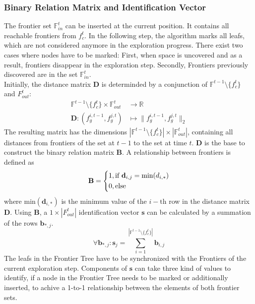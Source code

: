 \documentclass[twocolumn]{svjour3}[2016]
\begin{document}
\subsubsection{Binary Relation Matrix and Identification Vector}
The frontier set $\mathbb{F}^t_{in}$ can be inserted at the current position. It contains all reachable frontiers from $f^t_c$. In the following step, the algorithm marks all leafs, which are not considered anymore in the exploration progress. There exist two cases where nodes have to be marked: First, when space is uncovered and as a result, frontiers disappear in the exploration step. Secondly, Frontiers previously discovered are in the set $\mathbb{F}^t_{in}$.\\
Initially, the distance matrix $\textbf{D}$ is determinded by a conjunction of $\mathbb{F}^{t-1}\text{\textbackslash}\{f^t_c\}$ and ${F}^t_{out}$:
\begin{align}
\mathbb{F}^{t-1}\text{\textbackslash}\{f^t_c\} \times \mathbb{F}^t_{out} &\longrightarrow \mathbb{R}\\
\textbf{D}:(f^{i,t-1}_g, f^{j,t}_g)&\longmapsto\|f^{i,t-1}_g,f^{j,t}_g\|_2
\end{align}
The resulting matrix has the dimensions $|\mathbb{F}^{t-1}\text{\textbackslash}\{f^t_c\}|\times|\mathbb{F}^t_{out}|$, containing all distances from frontiers of the set at $t-1$ to the set at time $t$. $\textbf{D}$ is the base to construct the binary relation matrix $\textbf{B}$. A relationship between frontiers is defined as
\begin{equation}
\textbf{B} = 
\begin{dcases}
1, \textrm{if }\textbf{d}_{i,j} = \textrm{min}(d_{i,*})\\
0, \textrm{else}
\end{dcases}
\end{equation}
where $\textrm{min}(\textbf{d}_{i,*})$ is the minimum value of the $i-\textrm{th}$ row in the distance matrix $\textbf{D}$. Using $\textbf{B}$, a $1\times |{F}^t_{out}|$ identification vector $\textbf{s}$ can be calculated by a summation of the rows $\textbf{b}_{*,j}$.
\begin{equation}
\forall \textbf{b}_{*,j}: \textbf{s}_j =  \sum_{i=1}^{|\mathbb{F}^{t-1}\text{\textbackslash}\{f^t_c\}|}\textbf{b}_{i,j}
\end{equation}
The leafs in the Frontier Tree have to be synchronized with the Frontiers of the current exploration step. Components of $\textbf{s}$ can take three kind of values to identify, if a node in the Frontier Tree needs to be marked or additionally inserted, to achive a 1-to-1 relationship between the elements of both frontier sets.
\end{document}
